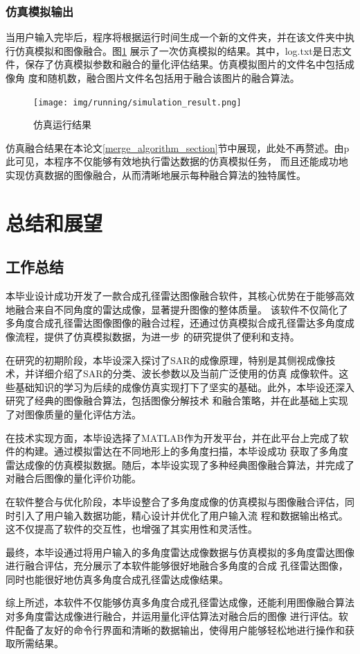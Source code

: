 \documentclass{xduugthesis}
\begin{document}
\subsection{仿真模拟输出}
当用户输入完毕后，程序将根据运行时间生成一个新的文件夹，并在该文件夹中执行仿真模拟和图像融合。图\ref{simulation_result}
展示了一次仿真模拟的结果。其中，log.txt是日志文件，保存了仿真模拟参数和融合的量化评估结果。仿真模拟图片的文件名中包括成像角
度和随机数，融合图片文件名包括用于融合该图片的融合算法。
\begin{figure}[!htb]
	\centering
	\texttt{[image: img/running/simulation\_result.png]}
	\caption{仿真运行结果}\label{simulation_result}
\end{figure}\par
仿真融合结果在本论文\ref{merge_algorithm_section}节中展现，此处不再赘述。由p此可见，本程序不仅能够有效地执行雷达数据的仿真模拟任务，
而且还能成功地实现仿真数据的图像融合，从而清晰地展示每种融合算法的独特属性。
\chapter{总结和展望}
\section{工作总结}
本毕业设计成功开发了一款合成孔径雷达图像融合软件，其核心优势在于能够高效地融合来自不同角度的雷达成像，显著提升图像的整体质量。
该软件不仅简化了多角度合成孔径雷达图像图像的融合过程，还通过仿真模拟合成孔径雷达多角度成像流程，提供了仿真模拟数据，为进一步
的研究提供了便利和支持。\par
在研究的初期阶段，本毕设深入探讨了SAR的成像原理，特别是其侧视成像技术，并详细介绍了SAR的分类、波长参数以及当前广泛使用的仿真
成像软件。这些基础知识的学习为后续的成像仿真实现打下了坚实的基础。此外，本毕设还深入研究了经典的图像融合算法，包括图像分解技术
和融合策略，并在此基础上实现了对图像质量的量化评估方法。\par
在技术实现方面，本毕设选择了MATLAB作为开发平台，并在此平台上完成了软件的构建。通过模拟雷达在不同地形上的多角度扫描，本毕设成功
获取了多角度雷达成像的仿真模拟数据。随后，本毕设实现了多种经典图像融合算法，并完成了对融合后图像的量化评价功能。\par
在软件整合与优化阶段，本毕设整合了多角度成像的仿真模拟与图像融合评估，同时引入了用户输入数据功能，精心设计并优化了用户输入流
程和数据输出格式。这不仅提高了软件的交互性，也增强了其实用性和灵活性。\par
最终，本毕设通过将用户输入的多角度雷达成像数据与仿真模拟的多角度雷达图像进行融合评估，充分展示了本软件能够很好地融合多角度的合成
孔径雷达图像，同时也能很好地仿真多角度合成孔径雷达成像结果。\par
综上所述，本软件不仅能够仿真多角度合成孔径雷达成像，还能利用图像融合算法对多角度雷达成像进行融合，并运用量化评估算法对融合后的图像
进行评估。软件配备了友好的命令行界面和清晰的数据输出，使得用户能够轻松地进行操作和获取所需结果。
\end{document}
